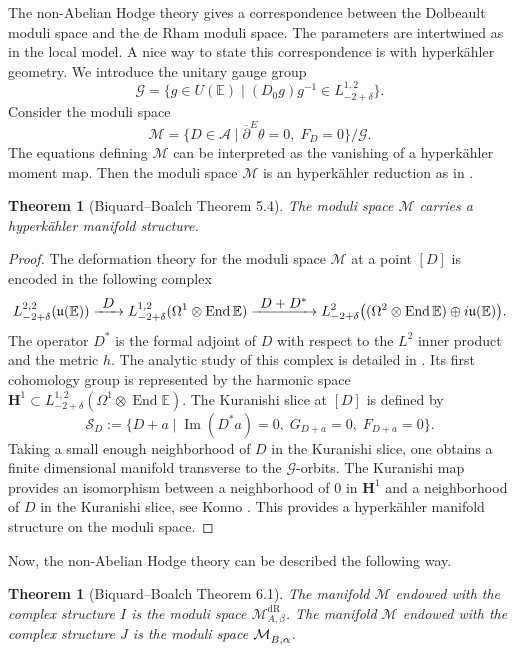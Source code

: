 \documentclass[JEP,XML,SOM,NoEqCountersInSection,Unicode,published]{cedram}
\def\To#1{\mathchoice{\xrightarrow{\textstyle\kern4pt#1\kern3pt}}{\stackrel{#1}{\longrightarrow}}{}{}}
\newcommand{\NoChangel}[1]{%
\expandafter\let\csname old\string#1\endcsname=#1
\let#1=\relax
\newcommand{#1}{\mathcode`l="716C\csname old\string#1\endcsname\mathcode`l="7160 }%
}
\newcommand{\Dol}{\mathrm{Dol}}\NoChangel{\Dol}
\newcommand{\dR}{\mathrm{dR}}
\theoremstyle{definition}
\theoremstyle{plain}
\newtheorem{theorem}[definition]{Theorem}
\DeclareMathOperator{\End}{End}
\DeclareMathOperator{\Imm}{Im}
\newcommand{\inv}{^{-1}}
\begin{document}
The non-Abelian Hodge theory gives a correspondence between the Dolbeault moduli space and the de Rham moduli space. The parameters are intertwined as in the local model. A nice way to state this correspondence is with hyperkähler geometry. We introduce the unitary gauge group
\[
\mathcal{G}=\lbrace g\in U(\mathbb{E}) \mid(D_0 g) g\inv \in L^{1,2}_{-2+\delta}\rbrace.
\]
Consider the moduli space
\[
\mathcal{M}=\lbrace D\in\mathcal{A} \mid \overline{\partial}^E \theta=0, \; F_D=0\rbrace/\mathcal{G}.
\]
The equations defining $\mathcal{M}$ can be interpreted as the vanishing of a hyperkähler moment map. Then the moduli space $\mathcal{M}$ is an hyperkähler reduction as in \cite{Hitchin_Karlhede_Lindstrom_Rocek}.
\begin{theorem}[Biquard--Boalch \cite{Biquard_Boalch_2004} Theorem 5.4]
The moduli space $\mathcal{M}$ carries a hyperkähler manifold structure.
\end{theorem}
\begin{proof}
The deformation theory for the moduli space $\mathcal{M}$ at a point $[D]$ is encoded in the following complex
\[
L^{2,2}_{-2+\delta}(\mathfrak{u}(\mathbb{E})) \To{D} L^{1,2}_{-2+\delta}(\Omega^1\otimes\End \mathbb{E}) \To{D+D^*} L^{2}_{-2 +\delta} \bigl((\Omega^2\otimes \End \mathbb{E})\oplus i\mathfrak{u}(\mathbb{E})\bigr).
\]
The operator $D^*$ is the formal adjoint of $D$ with respect to the $L^2$ inner product and the metric $h$. The analytic study of this complex is detailed in \cite{Biquard_Boalch_2004}. Its first cohomology group is represented by the harmonic space $\boldsymbol{H}^1 \subset L^{1,2}_{-2+\delta} \left(\Omega^1\otimes\End \mathbb{E}\right) $. The Kuranishi slice at $[D]$ is defined by
\begin{equation}\label{eq_kuranishi_slice}
\mathcal{S}_D :=\lbrace D+a \mid \Imm(D^* a)= 0, \; G_{D+a}=0, \; F_{D+a}=0\rbrace.
\end{equation}
Taking a small enough neighborhood of $D$ in the Kuranishi slice, one obtains a finite dimensional manifold transverse to the $\mathcal{G}$-orbits. The Kuranishi map provides an isomorphism between a neighborhood of $0$ in $\boldsymbol{H}^1$ and a neighborhood of $D$ in the Kuranishi slice, see Konno \cite[Lem.\,3.8, Th.\,3.9]{Konno}. This provides a hyperkähler manifold structure on the moduli space.
\end{proof}

Now, the non-Abelian Hodge theory can be described the following way.
\begin{theorem}[Biquard--Boalch \cite{Biquard_Boalch_2004} Theorem 6.1]
The manifold $\mathcal{M}$ endowed with the complex structure $I$ is the moduli space $\mathcal{M}^{\dR}_{A,\beta}$. The manifold $\mathcal{M}$ endowed with the complex structure $J$ is the moduli space $\mathcal{M}^{\Dol}_{B,\alpha}$.
\end{theorem}
\end{document}
